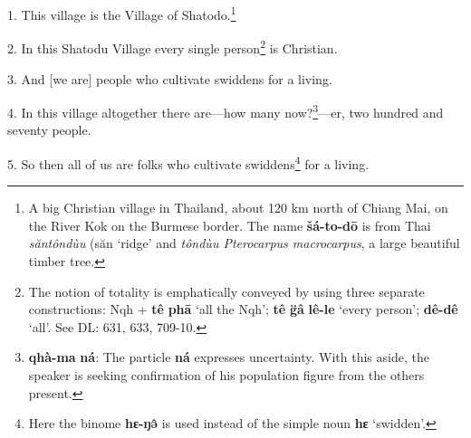 \setcounter{footnote}{0}

1. This village is the Village of Shatodo.\footnote{A big Christian village in Thailand, about 120 km north of Chiang Mai, on the River Kok on the Burmese border. The name \textbf{šá-to-dō} is from Thai \textit{săntôndùu} (săn `ridge' and \textit{tôndùu Pterocarpus macrocarpus}, a large beautiful timber tree.}

2. In this Shatodu Village every single person\footnote{The notion of totality is emphatically conveyed by using three separate constructions: Nqh + \textbf{tê} \textbf{phā} `all the Nqh'; \textbf{tê} \textbf{g̈â} \textbf{lê-le} `every person'; \textbf{dê-dê} `all'. See DL: 631, 633, 709-10.} is Christian.

3. And [we are] people who cultivate swiddens for a living.

4. In this village altogether there are---how many now?\footnote{\textbf{qhà-ma} \textbf{ná}: The particle \textbf{ná} expresses uncertainty. With this aside, the speaker is seeking confirmation of his population figure from the others present.}---er, two hundred and
seventy people.

5. So then all of us are folks who cultivate swiddens\footnote{Here the binome \textbf{hɛ-ŋə̂} is used instead of the simple noun \textbf{hɛ} `swidden'.} for a living.

